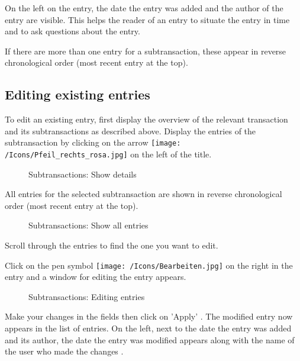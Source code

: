 On the left on the entry, the date the entry was added and the author of the entry  are visible. This helps the reader of an entry to situate the entry in time and to ask questions about the entry.

If there are more than one entry for a subtransaction, these appear in reverse chronological order (most recent entry at the top).

\subsection{Editing existing entries}

To edit an existing entry, first display the overview of the relevant transaction and its subtransactions as described above. Display the entries of the subtransaction by clicking on the arrow \texttt{[image: /Icons/Pfeil\_rechts\_rosa.jpg]} on the left of the title.
	
\begin{figure}[H]
\caption{Subtransactions: Show details}
\end{figure}

All entries for the selected subtransaction are shown in reverse chronological order (most recent entry at the top).

\begin{figure}[H]
\caption{Subtransactions: Show all entries}
\end{figure}

Scroll through the entries to find the one you want to edit.

\vspace{\baselineskip}

Click on the pen symbol \texttt{[image: /Icons/Bearbeiten.jpg]}  on the right in the entry and a window for editing the entry appears.

\begin{figure}[H]
\caption{Subtransactions: Editing entries}
\end{figure}

Make your changes in the fields then click on 'Apply' . The modified entry now appears in the list of entries. On the left, next to the date the entry was added and its author, the date the entry was modified appears along with the name of the user who made the changes .

